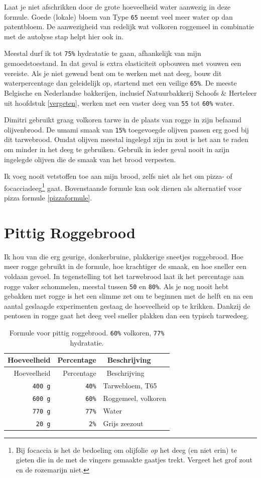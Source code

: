 \documentclass[
  11pt,
  dutch,
]{memoir}
\begin{document}
Laat je niet afschrikken door de grote hoeveelheid water aanwezig in
deze formule. Goede (lokale) bloem van Type \texttt{65} neemt veel meer
water op dan patentbloem. De aanwezigheid van redelijk wat volkoren
roggemeel in combinatie met de autolyse stap helpt hier ook in.

Meestal durf ik tot \texttt{75\%} hydratatie te gaan, afhankelijk van
mijn gemoedstoestand. In dat geval is extra elasticiteit opbouwen met
vouwen een vereiste. Als je niet gewend bent om te werken met nat deeg,
bouw dit waterpercentage dan geleidelijk op, startend met een veilige
\texttt{65\%}. De meeste Belgische en Nederlandse bakkerijen, inclusief
Natuurbakkerij Schoofs \& Herteleer uit hoofdstuk \ref{vergeten}, werken
met een vaster deeg van \texttt{55} tot \texttt{60\%} water.

Dimitri gebruikt graag volkoren tarwe in de plaats van rogge in zijn
befaamd olijvenbrood. De umami smaak van \texttt{15\%} toegevoegde
olijven passen erg goed bij dit tarwebrood. Omdat olijven meestal
ingelegd zijn in zout is het aan te raden om minder in het deeg te
gebruiken. Gebruik in ieder geval nooit in azijn ingelegde olijven die
de smaak van het brood verpesten.

Ik voeg nooit vetstoffen toe aan mijn brood, zelfs niet als het om
pizza- of focacciadeeg\footnote{Bij focaccia is het de bedoeling om
  olijfolie \emph{op} het deeg (en niet erin) te gieten die in de met de
  vingers gemaakte gaatjes trekt. Vergeet het grof zout en de rozemarijn
  niet.} gaat. Bovenstaande formule kan ook dienen als alternatief voor
pizza formule \ref{pizzaformule}.

\hypertarget{pittig-roggebrood}{%
\section{Pittig Roggebrood}\label{pittig-roggebrood}}

Ik hou van die erg geurige, donkerbruine, plakkerige sneetjes
roggebrood. Hoe meer rogge gebruikt in de formule, hoe krachtiger de
smaak, en hoe sneller een voldaan gevoel. In tegenstelling tot het
tarwebrood laat ik het percentage aan rogge vaker schommelen, meestal
tussen \texttt{50} en \texttt{80\%}. Als je nog nooit hebt gebakken met
rogge is het een slimme zet om te beginnen met de helft en na een aantal
geslaagde experimenten gestaag de hoeveelheid op te krikken. Dankzij de
pentosen in rogge gaat het deeg veel sneller plakken dan een typisch
tarwedeeg.

\begin{longtable}[]{@{}rrl@{}}
\caption{Formule voor pittig roggebrood. \texttt{60\%} volkoren,
\texttt{77\%} hydratatie.}\tabularnewline
\toprule
Hoeveelheid & Percentage & ~Beschrijving\tabularnewline
\midrule
\endfirsthead
\toprule
Hoeveelheid & Percentage & ~Beschrijving\tabularnewline
\midrule
\endhead
\texttt{400\ g} & \texttt{40\%} & Tarwebloem, T65\tabularnewline
\texttt{600\ g} & \texttt{60\%} & Roggemeel, volkoren\tabularnewline
\texttt{770\ g} & \texttt{77\%} & Water\tabularnewline
\texttt{20\ g} & \texttt{2\%} & Grijs zeezout\tabularnewline
\bottomrule
\end{longtable}
\end{document}
